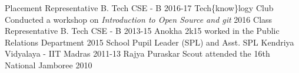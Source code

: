 \begin{cvhonors}
  \cvhonor
    {Placement Representative}
    {B. Tech CSE - B}
    {\empty}
    {2016-17}
  \cvhonor
    {Tech\{know\}logy Club}
    {Conducted a workshop on \textit{Introduction to Open Source and git}}
    {}
    {2016}
 \cvhonor
    {Class Representative}
    {B. Tech CSE - B}
    {\empty}
    {2013-15}
  \cvhonor
    {Anokha 2k15}
    {worked in the Public Relations Department}
    {}
    {2015}
  \cvhonor
    {School Pupil Leader (SPL) and Asst. SPL}
    {Kendriya Vidyalaya - IIT Madras}
    {\empty}
    {2011-13}
  \cvhonor
    {Rajya Puraskar Scout}
    {attended the 16th National Jamboree}
    {}
    {2010}
\end{cvhonors}